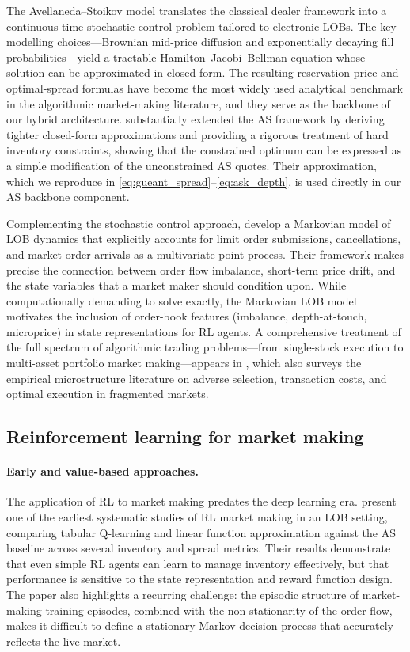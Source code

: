 \documentclass[11pt]{article}
\begin{document}
The Avellaneda--Stoikov model \parencite{avellaneda2008hftlob} translates
the classical dealer framework into a continuous-time stochastic control
problem tailored to electronic LOBs.
The key modelling choices---Brownian mid-price diffusion and exponentially
decaying fill probabilities---yield a tractable Hamilton--Jacobi--Bellman
equation whose solution can be approximated in closed form.
The resulting reservation-price and optimal-spread formulas have become
the most widely used analytical benchmark in the algorithmic
market-making literature, and they serve as the backbone of our hybrid
architecture.
\textcite{gueant2013inventory} substantially extended the AS framework by
deriving tighter closed-form approximations and providing a rigorous
treatment of hard inventory constraints, showing that the constrained
optimum can be expressed as a simple modification of the unconstrained
AS quotes.
Their approximation, which we reproduce in
\eqref{eq:gueant_spread}--\eqref{eq:ask_depth}, is used directly in our
AS backbone component.

Complementing the stochastic control approach, \textcite{cont2013markovlob}
develop a Markovian model of LOB dynamics that explicitly accounts for
limit order submissions, cancellations, and market order arrivals as a
multivariate point process.
Their framework makes precise the connection between order flow
imbalance, short-term price drift, and the state variables that a
market maker should condition upon.
While computationally demanding to solve exactly, the Markovian LOB
model motivates the inclusion of order-book features (imbalance,
depth-at-touch, microprice) in state representations for RL agents.
A comprehensive treatment of the full spectrum of algorithmic trading
problems---from single-stock execution to multi-asset portfolio market
making---appears in \textcite{cartea2015ahft}, which also surveys the
empirical microstructure literature on adverse selection, transaction
costs, and optimal execution in fragmented markets.

\subsection{Reinforcement learning for market making}

\paragraph{Early and value-based approaches.}
The application of RL to market making predates the deep learning era.
\textcite{spooner2018mmrl} present one of the earliest systematic studies
of RL market making in an LOB setting, comparing tabular Q-learning and
linear function approximation against the AS baseline across several
inventory and spread metrics.
Their results demonstrate that even simple RL agents can learn to manage
inventory effectively, but that performance is sensitive to the state
representation and reward function design.
The paper also highlights a recurring challenge: the episodic structure
of market-making training episodes, combined with the non-stationarity
of the order flow, makes it difficult to define a stationary Markov
decision process that accurately reflects the live market.
\end{document}
